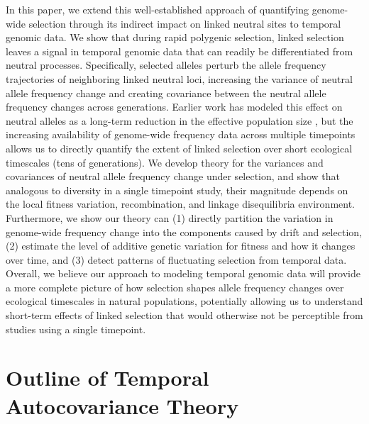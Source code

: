 \documentclass[11pt]{article}
\begin{document}
In this paper, we extend this well-established approach of quantifying
genome-wide selection through its indirect impact on linked neutral sites
to temporal genomic data. We show that during rapid polygenic selection, linked
selection leaves a signal in temporal genomic data that can readily be
differentiated from neutral processes. Specifically, selected alleles perturb
the allele frequency trajectories of neighboring linked neutral loci,
increasing the variance of neutral allele frequency change and creating
covariance between the neutral allele frequency changes across 
generations.  Earlier work has modeled this effect on neutral alleles as a
long-term reduction in the effective population size
\parencite{Robertson1961-ho,Santiago1995-hx,Santiago1998-bs,Wray1990-zf,J_A_Woolliams_N_R_Wray_R_Thompson2008-qo},
but the increasing availability of genome-wide frequency data across multiple
timepoints allows us to directly quantify the extent of linked selection over
short ecological timescales (tens of generations). We develop theory for the
variances and covariances of neutral allele frequency change under selection,
and show that analogous to diversity in a single timepoint study, their
magnitude depends on the local fitness variation, recombination, and linkage
disequilibria environment. Furthermore, we show our theory can (1) directly
partition the variation in genome-wide frequency change into the components
caused by drift and selection, (2) estimate the level of additive genetic
variation for fitness and how it changes over time, and (3) detect patterns of
fluctuating selection from temporal data. Overall, we believe our approach to
modeling temporal genomic data will provide a more complete picture of how
selection shapes allele frequency changes over ecological timescales in natural
populations, potentially allowing us to understand short-term effects of linked
selection that would otherwise not be perceptible from studies using a single
timepoint. 

\section{Outline of Temporal Autocovariance Theory}
\label{sec:outline-temp}
\end{document}
